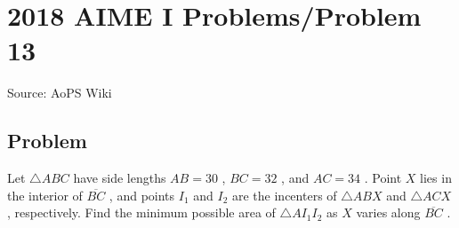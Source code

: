 \documentclass[12pt]{article}
\begin{document}
\section*{{2018 AIME I Problems/Problem 13}}
Source: AoPS Wiki

\subsection*{Problem}
Let $\triangle ABC$ have side lengths $AB=30$ , $BC=32$ , and $AC=34$ . Point $X$ lies in the interior of $\overline{BC}$ , and points $I_1$ and $I_2$ are the incenters of $\triangle ABX$ and $\triangle ACX$ , respectively. Find the minimum possible area of $\triangle AI_1I_2$ as $X$ varies along $\overline{BC}$ .
\end{document}
